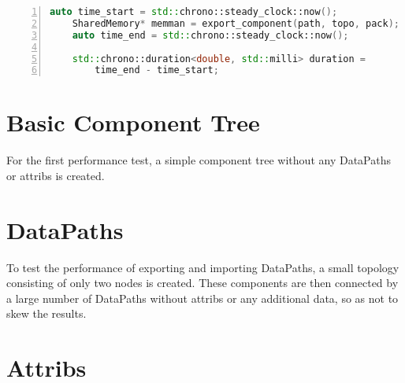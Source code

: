 \begin{lstlisting}[language=c++, numbers=left, caption= Measuring the Execution Time, captionpos=b, label={lst:perf_code}]
    auto time_start = std::chrono::steady_clock::now();
    SharedMemory* memman = export_component(path, topo, pack);
    auto time_end = std::chrono::steady_clock::now();

    std::chrono::duration<double, std::milli> duration =
        time_end - time_start;
\end{lstlisting}

\section{Basic Component Tree}
For the first performance test, a simple component tree without any DataPaths or attribs is created.

\section{DataPaths}
To test the performance of exporting and importing DataPaths, a small topology consisting of only two nodes is created.
These components are then connected by a large number of DataPaths without attribs or any additional data, so as not to skew the results.

\section{Attribs}